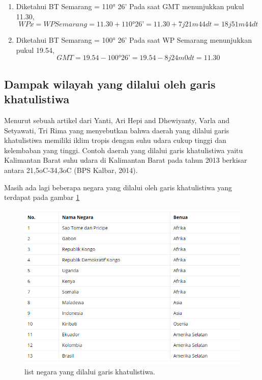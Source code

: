 \begin {enumerate}
\item
Diketahui BT Semarang = 110° 26’
Pada saat GMT menunjukkan pukul 11.30, 
\begin{equation}
WP x = WP Semarang = 11.30 + 110° 26’
= 11.30 + 7 j 21m 44dt
= 18 j 51 m 44 dt
\end{equation}

\item
Diketahui BT Semarang = 100° 26’
Pada saat WP Semarang menunjukkan pukul 19.54,
\begin{equation}
GMT = 19.54 - 100° 26’
    = 19.54 - 8 j 24m 0dt
    = 11.30
\end{equation}
\end {enumerate}

\cite {khusurur2016mengenal}

\subsection {Dampak wilayah yang dilalui oleh garis khatulistiwa}

	Menurut sebuah artikel dari Yanti, Ari Hepi and Dhewiyanty, Varla and Setyawati, Tri Rima yang menyebutkan bahwa daerah yang dilalui garis khatulistiwa 
memiliki iklim tropis dengan suhu udara cukup tinggi dan kelembaban yang tinggi. Contoh daerah yang dilalui garis khatulistiwa yaitu Kalimantan Barat
suhu udara di Kalimantan Barat pada tahun 2013 berkisar antara 21,5oC-34,3oC (BPS Kalbar, 2014). \cite {yanti2015prevalensi}

	Masih ada lagi beberapa negara yang dilalui oleh garis khatulistiwa yang terdapat pada gambar \ref{tabel_negara_yang_dilalui_garis_khatulistiwa}

\begin{figure}[ht]
\centerline{\includegraphics[width=1\textwidth]{figures/tabel_negara_yang_dilalui_garis_khatulistiwa.PNG}}
\caption{list negara yang dilalui garis khatulistiwa.}
\label{tabel_negara_yang_dilalui_garis_khatulistiwa}
\end{figure}


